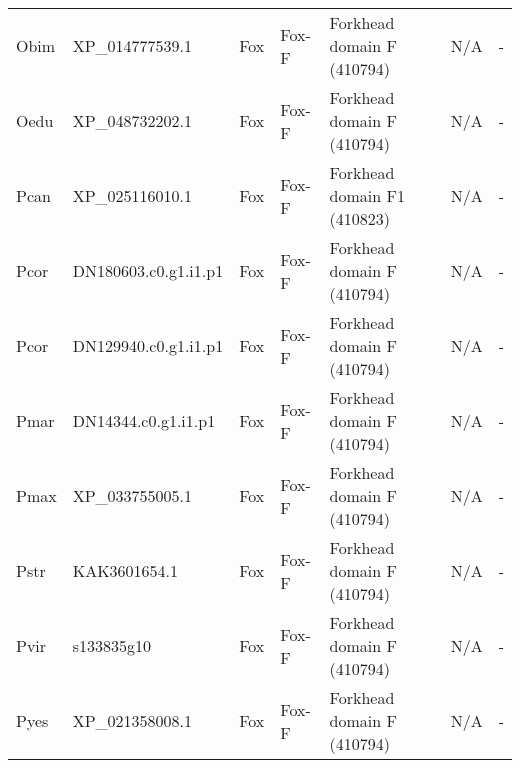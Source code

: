 \documentclass[../main.tex]{subfiles}
\begin{document}
\begin{landscape}
\begin{longtable}{lllllll}
		Obim           & XP\_014777539.1       & Fox            & Fox-F               & Forkhead domain F (410794)                  & N/A                                                                    & -                    \\
		Oedu           & XP\_048732202.1       & Fox            & Fox-F               & Forkhead domain F (410794)                  & N/A                                                                    & -                    \\
		Pcan           & XP\_025116010.1       & Fox            & Fox-F               & Forkhead domain F1 (410823)                 & N/A                                                                    & -                    \\
		Pcor           & DN180603.c0.g1.i1.p1  & Fox            & Fox-F               & Forkhead domain F (410794)                  & N/A                                                                    & -                    \\
		Pcor           & DN129940.c0.g1.i1.p1  & Fox            & Fox-F               & Forkhead domain F (410794)                  & N/A                                                                    & -                    \\
		Pmar           & DN14344.c0.g1.i1.p1   & Fox            & Fox-F               & Forkhead domain F (410794)                  & N/A                                                                    & -                    \\
		Pmax           & XP\_033755005.1       & Fox            & Fox-F               & Forkhead domain F (410794)                  & N/A                                                                    & -                    \\
		Pstr           & KAK3601654.1          & Fox            & Fox-F               & Forkhead domain F (410794)                  & N/A                                                                    & -                    \\
		Pvir           & s133835g10            & Fox            & Fox-F               & Forkhead domain F (410794)                  & N/A                                                                    & -                    \\
		Pyes           & XP\_021358008.1       & Fox            & Fox-F               & Forkhead domain F (410794)                  & N/A                                                                    & -                    \\

\end{longtable}
\end{landscape}
\end{document}
